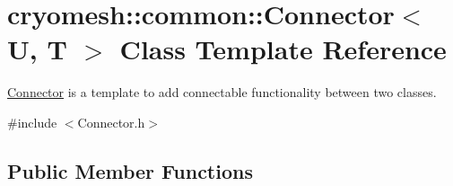 \hypertarget{classcryomesh_1_1common_1_1Connector}{\section{cryomesh\-:\-:common\-:\-:\-Connector$<$ \-U, \-T $>$ \-Class \-Template \-Reference}
\label{classcryomesh_1_1common_1_1Connector}
}


\hyperlink{classcryomesh_1_1common_1_1Connector}{\-Connector} is a template to add connectable functionality between two classes.  




{\ttfamily \#include $<$\-Connector.\-h$>$}

\subsection*{\-Public \-Member \-Functions}
